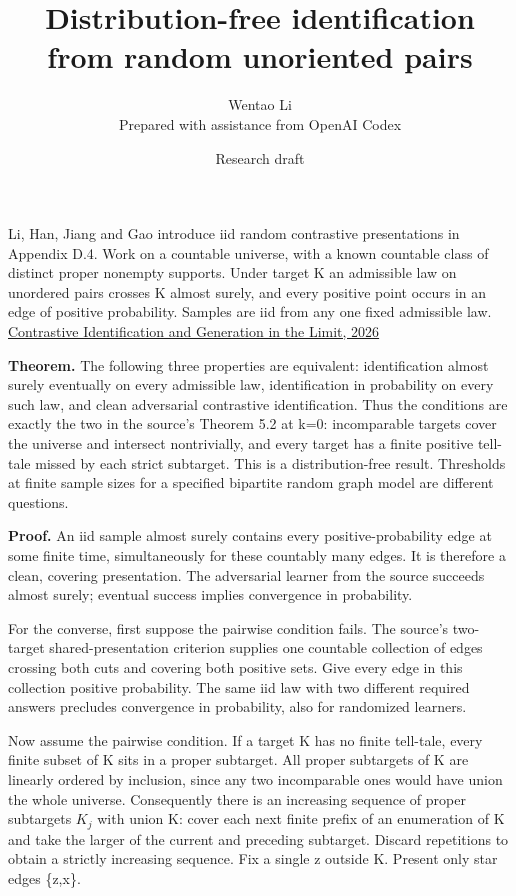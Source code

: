 \documentclass[11pt]{article}
\title{Distribution-free identification from random unoriented pairs}
\author{Wentao Li\\{\small Prepared with assistance from OpenAI Codex}}
\date{Research draft}
\begin{document}
\maketitle
Li, Han, Jiang and Gao introduce iid random contrastive presentations in Appendix D.4. Work on a countable universe, with a known countable class of distinct proper nonempty supports. Under target K an admissible law on unordered pairs crosses K almost surely, and every positive point occurs in an edge of positive probability. Samples are iid from any one fixed admissible law. \href{https://arxiv.org/abs/2605.06211v2}{Contrastive Identification and Generation in the Limit, 2026}

\textbf{Theorem.} The following three properties are equivalent: identification almost surely eventually on every admissible law, identification in probability on every such law, and clean adversarial contrastive identification. Thus the conditions are exactly the two in the source's Theorem 5.2 at k=0: incomparable targets cover the universe and intersect nontrivially, and every target has a finite positive tell-tale missed by each strict subtarget. This is a distribution-free result. Thresholds at finite sample sizes for a specified bipartite random graph model are different questions.

\textbf{Proof.} An iid sample almost surely contains every positive-probability edge at some finite time, simultaneously for these countably many edges. It is therefore a clean, covering presentation. The adversarial learner from the source succeeds almost surely; eventual success implies convergence in probability.

For the converse, first suppose the pairwise condition fails. The source's two-target shared-presentation criterion supplies one countable collection of edges crossing both cuts and covering both positive sets. Give every edge in this collection positive probability. The same iid law with two different required answers precludes convergence in probability, also for randomized learners.

Now assume the pairwise condition. If a target K has no finite tell-tale, every finite subset of K sits in a proper subtarget. All proper subtargets of K are linearly ordered by inclusion, since any two incomparable ones would have union the whole universe. Consequently there is an increasing sequence of proper subtargets \(K_{j}\) with union K: cover each next finite prefix of an enumeration of K and take the larger of the current and preceding subtarget. Discard repetitions to obtain a strictly increasing sequence. Fix a single z outside K. Present only star edges \{z,x\}.
\end{document}
